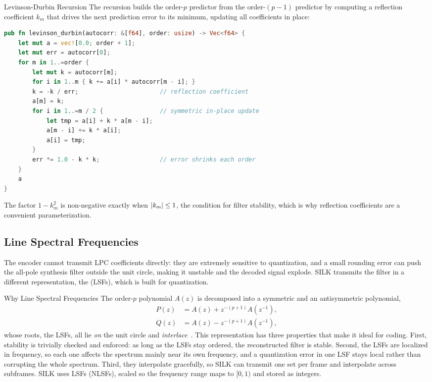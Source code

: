 \begin{implementation}{Levinson-Durbin Recursion}
  The recursion builds the order-$p$ predictor from the order-$(p-1)$ predictor
  by computing a reflection coefficient $k_m$ that drives the next prediction
  error to its minimum, updating all coefficients in place:
  \begin{lstlisting}[language=Rust]
pub fn levinson_durbin(autocorr: &[f64], order: usize) -> Vec<f64> {
    let mut a = vec![0.0; order + 1];
    let mut err = autocorr[0];
    for m in 1..=order {
        let mut k = autocorr[m];
        for i in 1..m { k += a[i] * autocorr[m - i]; }
        k = -k / err;                       // reflection coefficient
        a[m] = k;
        for i in 1..=m / 2 {                // symmetric in-place update
            let tmp = a[i] + k * a[m - i];
            a[m - i] += k * a[i];
            a[i] = tmp;
        }
        err *= 1.0 - k * k;                 // error shrinks each order
    }
    a
}
  \end{lstlisting}
  The factor $1 - k_m^2$ is non-negative exactly when $\lvert k_m\rvert \le 1$, the
  condition for filter stability, which is why reflection coefficients are a
  convenient parameterization.
\end{implementation}

\subsection{Line Spectral Frequencies}\label{subsec:silk_nlsf}

The encoder cannot transmit LPC coefficients directly: they are extremely
sensitive to quantization, and a small rounding error can push the all-pole
synthesis filter outside the unit circle, making it unstable and the decoded
signal explode. SILK transmits the filter in a different representation, the
 (LSFs), which is built for quantization.

\begin{concept}{Why Line Spectral Frequencies}
  The order-$p$ polynomial $A(z)$ is decomposed into a symmetric and an
  antisymmetric polynomial,
  \begin{align}
    P(z) &= A(z) + z^{-(p+1)} A(z^{-1}), \\
    Q(z) &= A(z) - z^{-(p+1)} A(z^{-1}),
  \end{align}
  whose roots, the LSFs, all lie \emph{on} the unit circle and
  \emph{interlace}~\cite{itakura1975line}. This representation has three
  properties that make it ideal for coding. First, stability is trivially
  checked and enforced: as long as the LSFs stay ordered, the reconstructed
  filter is stable. Second, the LSFs are localized in frequency, so each one
  affects the spectrum mainly near its own frequency, and a quantization error in
  one LSF stays local rather than corrupting the whole spectrum. Third, they
  interpolate gracefully, so SILK can transmit one set per frame and interpolate
  across subframes. SILK uses  LSFs (NLSFs), scaled so the
  frequency range maps to $[0, 1)$ and stored as  integers.
\end{concept}

